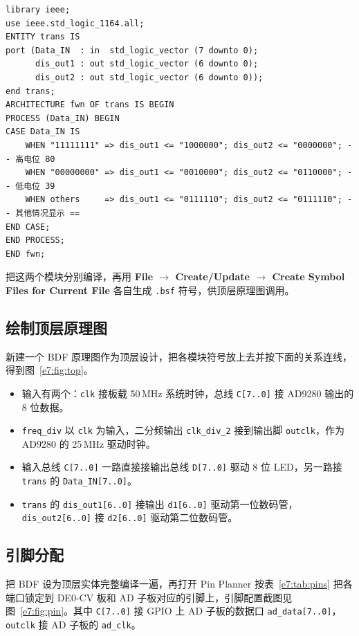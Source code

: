 \documentclass{ctexrep}
\begin{document}
\begin{verbatim}
library ieee;
use ieee.std_logic_1164.all;
ENTITY trans IS
port (Data_IN  : in  std_logic_vector (7 downto 0);
      dis_out1 : out std_logic_vector (6 downto 0);
      dis_out2 : out std_logic_vector (6 downto 0));
end trans;
ARCHITECTURE fwn OF trans IS BEGIN
PROCESS (Data_IN) BEGIN
CASE Data_IN IS
    WHEN "11111111" => dis_out1 <= "1000000"; dis_out2 <= "0000000"; -- 高电位 80
    WHEN "00000000" => dis_out1 <= "0010000"; dis_out2 <= "0110000"; -- 低电位 39
    WHEN others     => dis_out1 <= "0111110"; dis_out2 <= "0111110"; -- 其他情况显示 ==
END CASE;
END PROCESS;
END fwn;
\end{verbatim}
\label{e7:lst:trans}

把这两个模块分别编译，再用 \textbf{File $\rightarrow$ Create/Update $\rightarrow$ Create Symbol Files for Current File} 各自生成 \texttt{.bsf} 符号，供顶层原理图调用。

\subsection{绘制顶层原理图}

新建一个 BDF 原理图作为顶层设计，把各模块符号放上去并按下面的关系连线，得到图~\ref{e7:fig:top}。

\begin{itemize}
    \item 输入有两个：\texttt{clk} 接板载 50\,MHz 系统时钟，总线 \texttt{C[7..0]} 接 AD9280 输出的 8 位数据。
    \item \texttt{freq\_div} 以 \texttt{clk} 为输入，二分频输出 \texttt{clk\_div\_2} 接到输出脚 \texttt{outclk}，作为 AD9280 的 25\,MHz 驱动时钟。
    \item 输入总线 \texttt{C[7..0]} 一路直接接输出总线 \texttt{D[7..0]} 驱动 8 位 LED，另一路接 \texttt{trans} 的 \texttt{Data\_IN[7..0]}。
    \item \texttt{trans} 的 \texttt{dis\_out1[6..0]} 接输出 \texttt{d1[6..0]} 驱动第一位数码管，\texttt{dis\_out2[6..0]} 接 \texttt{d2[6..0]} 驱动第二位数码管。
\end{itemize}

\subsection{引脚分配}

把 BDF 设为顶层实体完整编译一遍，再打开 Pin Planner 按表~\ref{e7:tab:pins} 把各端口锁定到 DE0-CV 板和 AD 子板对应的引脚上，引脚配置截图见图~\ref{e7:fig:pin}。其中 \texttt{C[7..0]} 接 GPIO 上 AD 子板的数据口 \texttt{ad\_data[7..0]}，\texttt{outclk} 接 AD 子板的 \texttt{ad\_clk}。
\end{document}
